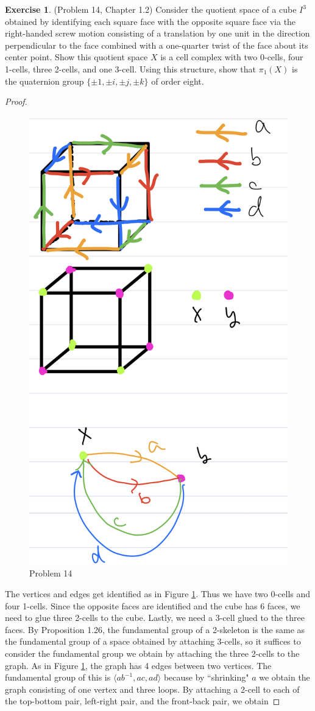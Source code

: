 \documentclass[12pt, psamsfonts]{amsart}
\theoremstyle{definition}
\newtheorem*{exer}{Exercise}
\theoremstyle{remark}
\numberwithin{equation}{section}
\begin{document}
\begin{exer}{(Problem 14, Chapter 1.2)}
  Consider the quotient space of a cube $I^3$ obtained by identifying each square face with the opposite square face via the right-handed screw motion consisting of a translation by one unit in the direction perpendicular to the face combined with a one-quarter twist of the face about its center point.
  Show this quotient space $X$ is a cell complex with two 0-cells, four 1-cells, three 2-cells, and one 3-cell.
  Using this structure, show that $\pi_1(X)$ is the quaternion group $\{ \pm 1, \pm i, \pm j, \pm k \}$ of order eight.
\end{exer}

\begin{proof}
  \begin{figure}
    \includegraphics[width=.5\linewidth]{cube.jpeg}
    \caption{Problem 14}
    \label{fig:cube}
  \end{figure}
  The vertices and edges get identified as in Figure \ref{fig:cube}.
  Thus we have two 0-cells and four 1-cells.
  Since the opposite faces are identified and the cube has 6 faces, we need to glue three 2-cells to the cube.
  Lastly, we need a 3-cell glued to the three faces.
  By Proposition 1.26, the fundamental group of a 2-skeleton is the same as the fundamental group of a space obtained by attaching 3-cells, so it suffices to consider the fundamental group we obtain by attaching the three 2-cells to the graph.
  As in Figure \ref{fig:cube}, the graph has 4 edges between two vertices.
  The fundamental group of this is $\langle ab^{-1}, ac, ad \rangle$ because by ``shrinking" $a$ we obtain the graph consisting of one vertex and three loops.
  By attaching a 2-cell to each of the top-bottom pair, left-right pair, and the front-back pair, we obtain


\end{proof}
\end{document}

